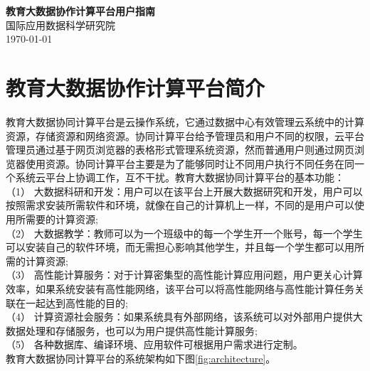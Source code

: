 \documentclass[12pt]{ctexart}%
\begin{document}
\begin{center}
  \Large \textbf{教育大数据协作计算平台用户指南} \\
  \vspace{0.1in}
  \normalsize 国际应用数据科学研究院 \\
  \today
\end{center}

\tableofcontents
\newpage

\section {教育大数据协作计算平台简介}
教育大数据协同计算平台是云操作系统，它通过数据中心有效管理云系统中的计算资源，存储资源和网络资源。协同计算平台给予管理员和用户不同的权限，云平台管理员通过基于网页浏览器的表格形式管理系统资源，然而普通用户则通过网页浏览器使用资源。协同计算平台主要是为了能够同时让不同用户执行不同任务在同一个系统云平台上协调工作，互不干扰。教育大数据协同计算平台的基本功能：\\
（1） 大数据科研和开发：用户可以在该平台上开展大数据研究和开发，用户可以按照需求安装所需软件和环境，就像在自己的计算机上一样，不同的是用户可以使用所需要的计算资源; \\
（2） 大数据教学：教师可以为一个班级中的每一个学生开一个账号，每一个学生可以安装自己的软件环境，而无需担心影响其他学生，并且每一个学生都可以用所需的计算资源; \\
（3） 高性能计算服务：对于计算密集型的高性能计算应用问题，用户更关心计算效率，如果系统安装有高性能网络，该平台可以将高性能网络与高性能计算任务关联在一起达到高性能的目的; \\
（4） 计算资源社会服务：如果系统具有外部网络，该系统可以对外部用户提供大数据处理和存储服务，也可以为用户提供高性能计算服务; \\
（5） 各种数据库、编译环境、应用软件可根据用户需求进行定制。\\
教育大数据协同计算平台的系统架构如下图\ref{fig:architecture}。
\end{document}
